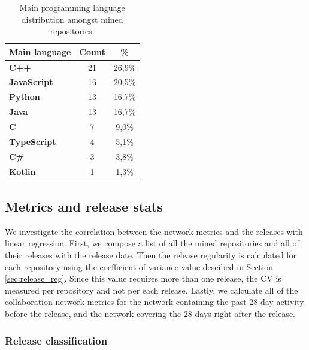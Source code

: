 \begin{table}
    \centering
    \begin{tabular}{| l | c | c |}
        \hline
        \textbf{Main language} & \textbf{Count} & \textbf{\%} \\
        \hline
        \textbf{C++} & 21 & 26,9\% \\
        \textbf{JavaScript} & 16 & 20,5\% \\
        \textbf{Python} & 13 & 16.7\% \\
        \textbf{Java} & 13 & 16,7\% \\
        \textbf{C} & 7 & 9,0\% \\
        \textbf{TypeScript} & 4 & 5,1\% \\
        \textbf{C\#} & 3 & 3,8\% \\
        \textbf{Kotlin} & 1 & 1,3\% \\        
        \hline
    \end{tabular}
    \caption{Main programming language distribution amongst mined repositories.}
    \label{tab:repo_lang}
\end{table}

\subsection{Metrics and release stats}

We investigate the correlation between the network metrics and the releases with linear regression. First, we compose a list of all the mined repositories and all of their releases with the release date. Then the release regularity is calculated for each repository using the coefficient of variance value descibed in Section \ref{sec:release_reg}. Since this value requires more than one release, the CV is measured per repository and not per each release. Lastly, we calculate all of the collaboration network metrics for the network containing the past 28-day activity before the release, and the network covering the 28 days right after the release.

\subsubsection{Release classification}

